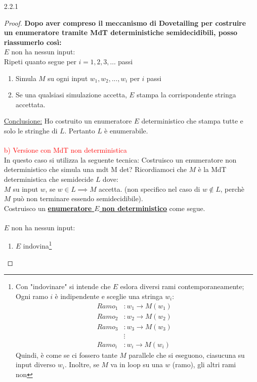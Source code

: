 \documentclass{article}  %
\theoremstyle{definition}
\begin{document}
\begin{theorem}{2.2.1}
\begin{proof}
		\textbf{Dopo aver compreso il meccanismo di Dovetailing per costruire un enumeratore tramite MdT deterministiche semidecidibili, posso riassumerlo così:} \\
		$E$ non ha nessun input: \\
		Ripeti quanto segue per $i=1,2,3,\dots$ passi
		\begin{enumerate}
			\item Simula $M$ su ogni input $w_1,w_2,...,w_i$ per $i$ passi
			\item Se una qualsiasi simulazione accetta, $E$ stampa la corrispondente stringa accettata.
		\end{enumerate}
		\underline{Conclusione:} Ho costruito un enumeratore $E$ deterministico che stampa tutte e solo le stringhe di $L$. Pertanto $L$ è enumerabile. \\ \\
		\textcolor{red}{b) Versione con MdT non deterministica} \\
		In questo caso si utilizza la seguente tecnica: Costruisco un enumeratore non deterministico che simula una mdt M det?
		Ricordiamoci che $M$ è la MdT deterministica che semidecide $L$ dove: \\
		$M$ su input $w$, se $w \in L \implies M$ accetta. (non specifico nel caso di $w \notin L$, perchè $M$ può non terminare essendo semidecidibile). \\
		Costruisco un \textcolor{green!60!black}{\underline{\textbf{enumeratore $E$ non deterministico}}} come segue. \\ \\
		$E$ non ha nessun input:
		\begin{enumerate}
			\item $E$ indovina\footnote{
				      Con "indovinare" si intende che $E$ eslora diversi rami contemporaneamente; Ogni ramo $i$ è indipendente e sceglie una stringa $w_i$:
				      \begin{align*}
					      Ramo_1 & : w_1 \rightarrow M(w_1) \\
					      Ramo_2 & : w_2 \rightarrow M(w_2) \\
					      Ramo_3 & : w_3 \rightarrow M(w_3) \\
					             & \vdots                   \\
					      Ramo_i & : w_i \rightarrow M(w_i)
				      \end{align*}
				      Quindi, è come se ci fossero tante $M$ parallele che si eseguono, ciasucuna su input diverso $w_i$. Inoltre, se $M$ va in loop su una $w$ (ramo), gli altri rami non
}
\end{enumerate}
\end{proof}
\end{theorem}
\end{document}

